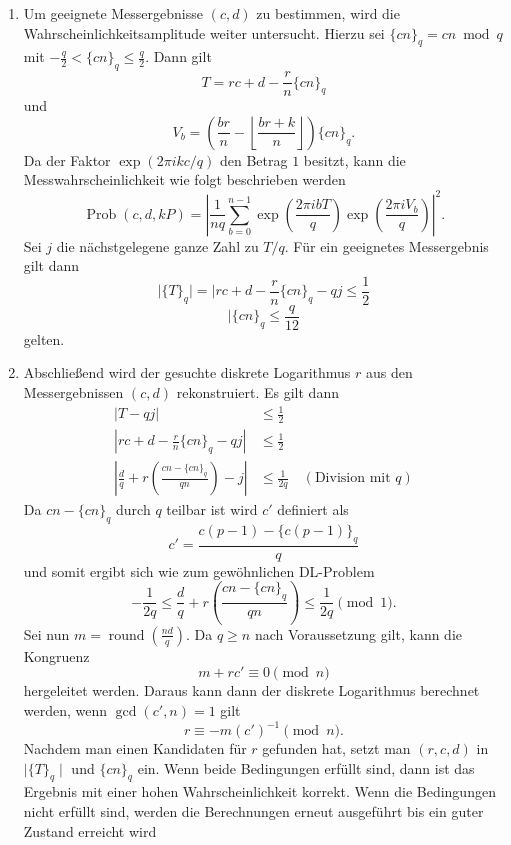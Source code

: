 \begin{enumerate}
    Die Wahrscheinlichkeit diesen Zustand zu beobachten, beträgt
    \[
    \operatorname{Prob}(c,d,kP)=
    \left|\frac{1}{nq}
    \sum_{\substack{
    0\leq a,b<n\\
    a-br\equiv k \bmod n
    }}
    \exp\left(
    \frac{2\pi i}{q}(ac+bd)\right)\right|^2.
    \]
    Aus der Kongruenz folgt
    \[
    a=k+br-n\left\lfloor
    \frac{k+br}{n}
    \right\rfloor.
    \]
    Einsetzen in die Wahrscheinlichkeitsamplitude liefert
    \[
    \frac{1}{nq}\sum_{b=0}^{n-1}
    \exp\Bigg(
    \frac{2\pi i}{q}\Bigg[
    kc+brc+bd
    -cn\left\lfloor
    \frac{k+br}{n}
    \right\rfloor
    \Bigg]\Bigg).
    \]
    \item Um geeignete Messergebnisse $(c,d)$ zu bestimmen, wird die Wahrscheinlichkeitsamplitude weiter untersucht. Hierzu sei ${\{cn\}}_q=cn\bmod q$ mit \(-\frac{q}{2}<{\{cn\}}_q\leq\frac{q}{2}\). Dann gilt 
    \[
    T = rc+d-\frac{r}{n}{\{cn\}}_q
    \]
    und 
    \[
    V_b=\left(\frac{br}{n}-\left\lfloor\frac{br+k}{n}\right\rfloor\right){\{cn\}}_q.
    \]
    Da der Faktor $\exp(2\pi ikc/q)$ den Betrag $1$ besitzt, kann die Messwahrscheinlichkeit wie folgt beschrieben werden
    \[
    \operatorname{Prob}(c,d,kP)=
    \left|
    \frac{1}{nq}
    \sum_{b=0}^{n-1}
    \exp\left(\frac{2\pi ibT}{q}\right)
    \exp\left(\frac{2\pi iV_b}{q}\right)
    \right|^2.
    \]
    Sei $j$ die nächstgelegene ganze Zahl zu $T/q$. Für ein geeignetes Messergebnis gilt dann
    \[
    \mid{\{T\}}_q\mid=|rc+d-\frac{r}{n}{\{cn\}}_q-qj\leq \frac{1}{2} 
    \]
    \[
    |{\{cn\}}_q\leq\frac{q}{12}
    \]
    gelten.
    \item Abschließend wird der gesuchte diskrete Logarithmus $r$ aus den Messergebnissen $(c,d)$ rekonstruiert. Es gilt dann
    \begin{align*}
        |T-qj|&\leq\frac{1}{2}\\
        \left| rc+d-\frac{r}{n}{\{cn\}}_q-qj\right|&\leq\frac{1}{2}\\
         \left|\frac{d}{q}+r\left(\frac{cn-{\{cn\}}_q}{qn}\right)-j\right|&\leq\frac{1}{2q} \quad(\text{Division mit }q)
    \end{align*}
    Da $cn-{\{cn\}}_q$ durch $q$ teilbar ist wird $c'$ definiert als
    \[
    c'=\frac{c(p-1)-{\{c(p-1)\}}_q}{q}
    \]
    und somit ergibt sich wie zum gewöhnlichen DL-Problem
    \[
    -\frac{1}{2q}
    \leq
    \frac{d}{q}
    +r\left(
    \frac{cn-{\{cn\}}_q}{qn}
    \right)
    \leq
    \frac{1}{2q}
    \pmod 1.
    \]
    Sei nun \(m=\operatorname{round}\left(\frac{nd}{q}\right)\). Da $q\geq n$ nach Voraussetzung gilt, kann die Kongruenz 
    \[
    m+rc'\equiv0\pmod n
    \]
    hergeleitet werden. Daraus kann dann der diskrete Logarithmus berechnet werden, wenn $\gcd(c',n)=1$ gilt 
    \[
    r\equiv-m{(c')}^{-1}\pmod n.
    \]
    Nachdem man einen Kandidaten für $r$ gefunden hat, setzt man $(r,c,d)$ in $\mid{\{T\}}_q\mid$ und ${\{cn\}}_q$ ein. Wenn beide Bedingungen erfüllt sind, dann ist das Ergebnis mit einer hohen Wahrscheinlichkeit korrekt. Wenn die Bedingungen nicht erfüllt sind, werden die Berechnungen erneut ausgeführt bis ein guter Zustand erreicht wird
\end{enumerate}
